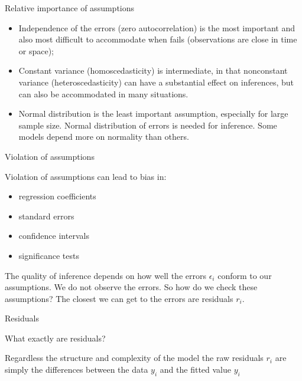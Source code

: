 \documentclass{beamer}
\begin{document}
\begin{frame}{Relative importance of assumptions}
\begin{itemize}
	\item Independence of the errors (zero autocorrelation) is the most important and also most difficult to accommodate when fails (observations are close in time or space);
	\pause
\item Constant variance (homoscedasticity) is intermediate, in that nonconstant variance (heteroscedasticity) can have a substantial effect on inferences, but can also be accommodated in many situations.
	\pause
\item Normal distribution is the least important assumption, especially for large sample size.
Normal distribution of errors is needed for inference. Some models depend more on normality than others.

\end{itemize}
\end{frame}


\begin{frame}{Violation of assumptions}

Violation of assumptions can lead to bias in:

\begin{itemize}
	\item regression coefficients
	\item standard errors
	\item confidence intervals
	\item significance tests  
\end{itemize}
	\vspace{1cm}
\pause The quality of inference depends on how well the errors $\epsilon_{i}$ conform to our assumptions.
\pause  We do not observe the errors. So how do we check these assumptions?
\pause The closest we can get to the errors are residuals $r_{i}$.
\end{frame}

\begin{frame}{Residuals}

What exactly are residuals?
\pause
\vspace{1cm}

Regardless the structure and complexity of the model the raw residuals $r_{i}$ are simply the differences between the data $y_{i}$ and the fitted value $y_{i}$ 

\end{frame}
\end{document}
